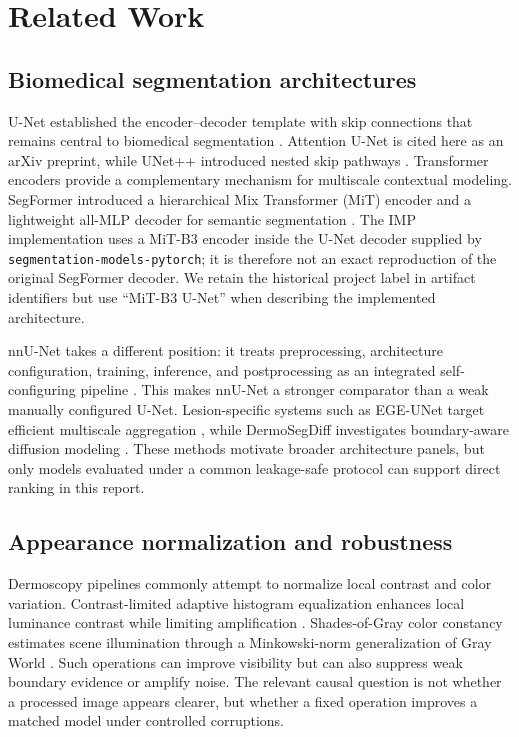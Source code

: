 \section{Related Work}

\subsection{Biomedical segmentation architectures}

U-Net established the encoder--decoder template with skip connections that remains central to biomedical segmentation \citep{unet2015}. Attention U-Net is cited here as an arXiv preprint, while UNet++ introduced nested skip pathways \citep{attentionunet2018,unetplusplus2018}. Transformer encoders provide a complementary mechanism for multiscale contextual modeling. SegFormer introduced a hierarchical Mix Transformer (MiT) encoder and a lightweight all-MLP decoder for semantic segmentation \citep{segformer2021}. The IMP implementation uses a MiT-B3 encoder inside the U-Net decoder supplied by \texttt{segmentation-models-pytorch}; it is therefore not an exact reproduction of the original SegFormer decoder. We retain the historical project label in artifact identifiers but use ``MiT-B3 U-Net'' when describing the implemented architecture.

nnU-Net takes a different position: it treats preprocessing, architecture configuration, training, inference, and postprocessing as an integrated self-configuring pipeline \citep{nnunet2021}. This makes nnU-Net a stronger comparator than a weak manually configured U-Net. Lesion-specific systems such as EGE-UNet target efficient multiscale aggregation \citep{egeunet2023}, while DermoSegDiff investigates boundary-aware diffusion modeling \citep{dermosegdiff2023}. These methods motivate broader architecture panels, but only models evaluated under a common leakage-safe protocol can support direct ranking in this report.

\subsection{Appearance normalization and robustness}

Dermoscopy pipelines commonly attempt to normalize local contrast and color variation. Contrast-limited adaptive histogram equalization enhances local luminance contrast while limiting amplification \citep{zuiderveld1994clahe}. Shades-of-Gray color constancy estimates scene illumination through a Minkowski-norm generalization of Gray World \citep{finlayson2004shades}. Such operations can improve visibility but can also suppress weak boundary evidence or amplify noise. The relevant causal question is not whether a processed image appears clearer, but whether a fixed operation improves a matched model under controlled corruptions.

